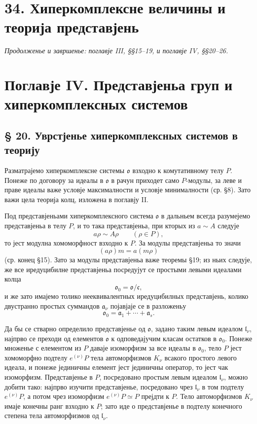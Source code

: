 ﻿\documentclass[11pt]{article}
\providecommand{\mo}{\mathfrak{o}}
\providecommand{\ma}{\mathfrak{a}}
\providecommand{\ml}{\mathfrak{l}}
\providecommand{\mc}{\mathfrak{c}}
\begin{document}
\section*{34. Хиперкомплексне величины и теорија представјень}
\emph{Продолженье и завршенье: поглавје III, §§15--19, и поглавје IV, §§20--26.}

\section*{Поглавје IV. Представјеньа груп и хиперкомплексных системов}

\subsection*{§ 20. Уврстјенье хиперкомплексных системов в теорију}

Разматрајемо хиперкомплексне системы $\mo$ взходно к комутативному телу $P$. Понеже по договору за идеалы в $\mo$ в рачун приходет само $P$-модулы, за леве и праве идеалы важе условје максималности и условје минималности (ср. §8). Зато важи цела теорија колц, изложена в поглавју II.

Под представјеньами хиперкомплексного система $\mo$ в дальньем всегда разумејемо представјеньа в телу $P$, и то така представјеньа, при кторых из $a\sim A$ следује
\[
        a\rho\sim A\rho \qquad(\rho\in P),
\]
то јест модулна хомоморфност взходно к $P$. За модулы представјеньа то значи
\[
        (a\rho)m=a(m\rho)
\]
(ср. конец §15). Зато за модулы представјеньа важе теоремы §19; из ньих следује, же все иредуцибилне представјеньа посредујут се простыми левыми идеалами колца
\[
        \mo_0=\mo/\mc,
\]
и же зато имајемо толико нееквивалентных иредуцибилных представјень, колико двустранно простых суммандов $\ma_\nu$ појавјаје се в разложеньу
\[
        \mo_0=\ma_1+\cdots+\ma_s.
\]

Да бы се стварно определило представјенье од $\mo$, задано таким левым идеалом $\ml_\nu$, најпрво се преходи од елементов $\mo$ к одповедајучим класам остатков в $\mo_0$. Понеже множенье с елементом из $P$ даваје изоморфизм за все идеалы в $\mo_0$, тело $P$ јест хомоморфно подтелу $e^{(\nu)}P$ тела автоморфизмов $K_\nu$ всакого простого левого идеала, и понеже јединичны елемент јест јединичны оператор, то јест чак изоморфизм. Представјенье в $P$, посредовано простым левым идеалом $\ml_\nu$, можно добити тако: најпрво изучити представјенье, посредовано чрез $\ml_\nu$ в том подтелу $e^{(\nu)}P$, а потом чрез изоморфизм $e^{(\nu)}P\simeq P$ прејдти к $P$. Тело автоморфизмов $K_\nu$ имаје конечны ранг взходно к $P$; зато иде о представјенье в подтелу конечного степена тела автоморфизмов од $\ml_\nu$.
\end{document}
